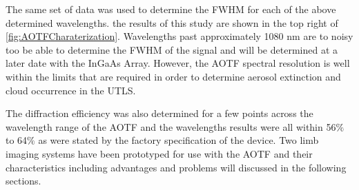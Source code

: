 The same set of data was used to determine the FWHM for each of the above determined wavelengths. the results of this study are shown in the top right of \autoref{fig:AOTFCharaterization}. Wavelengths past approximately 1080 nm are to noisy too be able to determine the FWHM of the signal and will be determined at a later date with the InGaAs Array. However, the AOTF spectral resolution is well within the limits that are required in order to determine aerosol extinction and cloud occurrence in the UTLS.

The diffraction efficiency was also determined for a few points across the wavelength range of the AOTF and the wavelengths results were all within 56$\%$ to 64$\%$ as were stated by the factory specification of the device. Two limb imaging systems have been prototyped for use with the AOTF and their characteristics including advantages and problems will discussed in the following sections. 